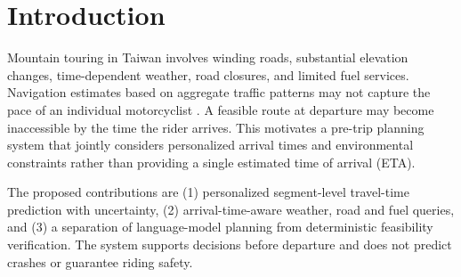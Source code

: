 \section{Introduction}
Mountain touring in Taiwan involves winding roads, substantial elevation changes, time-dependent weather, road closures, and limited fuel services. Navigation estimates based on aggregate traffic patterns may not capture the pace of an individual motorcyclist \cite{eta}. A feasible route at departure may become inaccessible by the time the rider arrives. This motivates a pre-trip planning system that jointly considers personalized arrival times and environmental constraints rather than providing a single estimated time of arrival (ETA).

The proposed contributions are (1) personalized segment-level travel-time prediction with uncertainty, (2) arrival-time-aware weather, road and fuel queries, and (3) a separation of language-model planning from deterministic feasibility verification. The system supports decisions before departure and does not predict crashes or guarantee riding safety.
